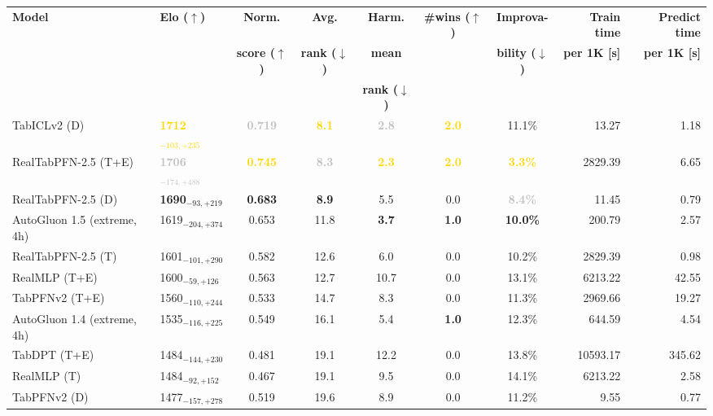 \begin{tabular}{llcccccrr}
\toprule
\textbf{Model} & \textbf{Elo ($\uparrow$)} & \textbf{Norm.} & \textbf{Avg.} & \textbf{Harm.} & \textbf{\#wins ($\uparrow$)} & \textbf{Improva-} & \textbf{Train time} & \textbf{Predict time} \\
 &  & \textbf{score ($\uparrow$)} & \textbf{rank ($\downarrow$)} & \textbf{mean} &  & \textbf{bility ($\downarrow$)} & \textbf{per 1K [s]} & \textbf{per 1K [s]} \\
 &  &  &  & \textbf{rank ($\downarrow$)} &  &  &  &  \\
\midrule
TabICLv2 (D) & \textcolor{gold}{\textbf{1712${}_{-103,+235}$}} & \textcolor{silver}{\textbf{0.719}} & \textcolor{gold}{\textbf{8.1}} & \textcolor{silver}{\textbf{2.8}} & \textcolor{gold}{\textbf{2.0}} & 11.1\% & 13.27 & 1.18 \\
RealTabPFN-2.5 (T+E) & \textcolor{silver}{\textbf{1706${}_{-174,+488}$}} & \textcolor{gold}{\textbf{0.745}} & \textcolor{silver}{\textbf{8.3}} & \textcolor{gold}{\textbf{2.3}} & \textcolor{gold}{\textbf{2.0}} & \textcolor{gold}{\textbf{3.3\%}} & 2829.39 & 6.65 \\
RealTabPFN-2.5 (D) & \textcolor{bronze}{\textbf{1690${}_{-93,+219}$}} & \textcolor{bronze}{\textbf{0.683}} & \textcolor{bronze}{\textbf{8.9}} & 5.5 & 0.0 & \textcolor{silver}{\textbf{8.4\%}} & 11.45 & 0.79 \\
AutoGluon 1.5 (extreme, 4h) & 1619${}_{-204,+374}$ & 0.653 & 11.8 & \textcolor{bronze}{\textbf{3.7}} & \textcolor{bronze}{\textbf{1.0}} & \textcolor{bronze}{\textbf{10.0\%}} & 200.79 & 2.57 \\
RealTabPFN-2.5 (T) & 1601${}_{-101,+290}$ & 0.582 & 12.6 & 6.0 & 0.0 & 10.2\% & 2829.39 & 0.98 \\
RealMLP (T+E) & 1600${}_{-59,+126}$ & 0.563 & 12.7 & 10.7 & 0.0 & 13.1\% & 6213.22 & 42.55 \\
TabPFNv2 (T+E) & 1560${}_{-110,+244}$ & 0.533 & 14.7 & 8.3 & 0.0 & 11.3\% & 2969.66 & 19.27 \\
AutoGluon 1.4 (extreme, 4h) & 1535${}_{-116,+225}$ & 0.549 & 16.1 & 5.4 & \textcolor{bronze}{\textbf{1.0}} & 12.3\% & 644.59 & 4.54 \\
TabDPT (T+E) & 1484${}_{-144,+230}$ & 0.481 & 19.1 & 12.2 & 0.0 & 13.8\% & 10593.17 & 345.62 \\
RealMLP (T) & 1484${}_{-92,+152}$ & 0.467 & 19.1 & 9.5 & 0.0 & 14.1\% & 6213.22 & 2.58 \\
TabPFNv2 (D) & 1477${}_{-157,+278}$ & 0.519 & 19.6 & 8.9 & 0.0 & 11.2\% & 9.55 & 0.77 \\

\end{tabular}
